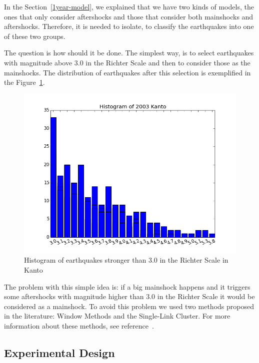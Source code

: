 In the Section~\ref{1year-model}, we explained that we have two kinds of models, the ones that only consider aftershocks and those that consider both mainshocks and aftershocks. Therefore, it is needed to isolate, to classify the earthquakes into one of these two groups.

The question is how should it be done. The simplest way, is to select earthquakes with magnitude above 3.0 in the Richter Scale and then to consider those as the mainshocks. The distribution of earthquakes after this selection is exemplified in the Figure~\ref{quakesKanto}.

\begin{figure}[H]
	\centering
	\includegraphics[scale=0.35]{img/Magnitude2003Kanto.png}
	\caption{Histogram of earthquakes stronger than 3.0 in the Richter Scale in Kanto}
	\label{quakesKanto}
\end{figure}

The problem with this simple idea is: if a big mainshock happens and it triggers some aftershocks with magnitude higher than 3.0 in the Richter Scale it would be considered as a mainshock. To avoid this problem we used two methods proposed in the literature: Window Methods and the Single-Link Cluster. For more information about these methods, see reference~\cite{van2012seismicity}.

\subsection{Experimental Design}

